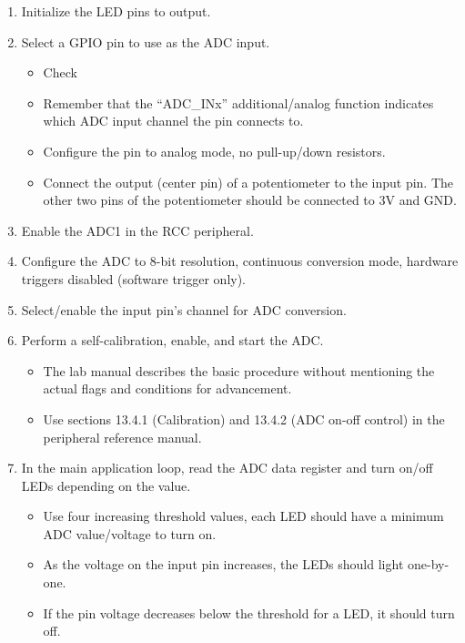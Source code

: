 \documentclass[openany,11pt,fleqn]{book} %
\begin{document}
\begin{enumerate} 
    \item Initialize the LED pins to output.
    \item Select a GPIO pin to use as the ADC input.
    \begin{itemize}
        \item Check 
        \item Remember that the ``ADC\_INx'' additional/analog function indicates which ADC input channel the pin connects to.
        \item Configure the pin to analog mode, no pull-up/down resistors.
        \item Connect the output (center pin) of a potentiometer to the input pin. The other two pins of the potentiometer should be connected to 3V and GND.
    \end{itemize} 
    
    \begin{warning}
        
    \end{warning}

    \item Enable the ADC1 in the RCC peripheral. 
    \item Configure the ADC to 8-bit resolution, continuous conversion mode, hardware triggers disabled (software trigger only).
    \item Select/enable the input pin's channel for ADC conversion.
    \item Perform a self-calibration, enable, and start the ADC.
    \begin{itemize}
        \item The lab manual describes the basic procedure without mentioning the actual flags and conditions for advancement. 
        \item Use sections 13.4.1 (Calibration) and 13.4.2 (ADC on-off control) in the peripheral reference manual. 
    \end{itemize}
    \item In the main application loop, read the ADC data register and turn on/off LEDs depending on the value.
    \begin{itemize}
        \item Use four increasing threshold values, each LED should have a minimum ADC value/voltage to turn on.
        \item As the voltage on the input pin increases, the LEDs should light one-by-one.
        \item If the pin voltage decreases below the threshold for a LED, it should turn off. 
    \end{itemize}
\end{enumerate}
\end{document}
